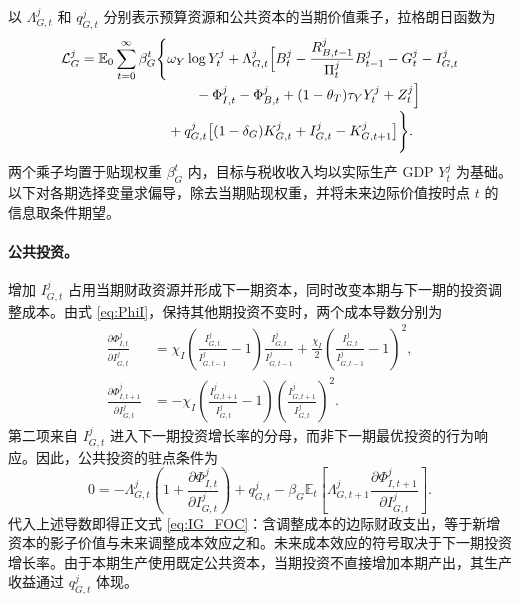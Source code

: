 \documentclass[12pt,UTF8]{ctexart}
\newcommand{\E}{\mathbb{E}}
\begin{document}
	以 $\Lambda_{G,t}^j$ 和 $q_{G,t}^j$ 分别表示预算资源和公共资本的当期价值乘子，拉格朗日函数为
	\begin{align}
		\mathcal L_G^j=\E_0\sum_{t=0}^{\infty}\beta_G^t\Bigg\{&\omega_Y\log Y_t^j
		+\Lambda_{G,t}^j\Big[B_t^j-\frac{R_{B,t-1}^j}{\Pi_t^j}B_{t-1}^j-G_t^j-I_{G,t}^j \notag\\[-0.2em]
		&\qquad-\Phi_{I,t}^j-\Phi_{B,t}^j
		+(1-\theta_T)\tau_Y Y_t^j+Z_t^j\Big] \notag\\[-0.2em]
		&+q_{G,t}^j\big[(1-\delta_G)K_{G,t}^j+I_{G,t}^j-K_{G,t+1}^j\big]\Bigg\}.
		\label{eq:gov_lagrangian}
	\end{align}
	两个乘子均置于贴现权重 $\beta_G^t$ 内，目标与税收收入均以实际生产 GDP $Y_t^j$ 为基础。以下对各期选择变量求偏导，除去当期贴现权重，并将未来边际价值按时点 $t$ 的信息取条件期望。
	
	\paragraph{公共投资。}
	增加 $I_{G,t}^j$ 占用当期财政资源并形成下一期资本，同时改变本期与下一期的投资调整成本。由式 \eqref{eq:PhiI}，保持其他期投资不变时，两个成本导数分别为
	\begin{align*}
		\frac{\partial\Phi_{I,t}^j}{\partial I_{G,t}^j}
		&=\chi_I\left(\frac{I_{G,t}^j}{I_{G,t-1}^j}-1\right)
		\frac{I_{G,t}^j}{I_{G,t-1}^j}
		+\frac{\chi_I}{2}\left(\frac{I_{G,t}^j}{I_{G,t-1}^j}-1\right)^2,\\
		\frac{\partial\Phi_{I,t+1}^j}{\partial I_{G,t}^j}
		&=-\chi_I\left(\frac{I_{G,t+1}^j}{I_{G,t}^j}-1\right)
		\left(\frac{I_{G,t+1}^j}{I_{G,t}^j}\right)^2.
	\end{align*}
	第二项来自 $I_{G,t}^j$ 进入下一期投资增长率的分母，而非下一期最优投资的行为响应。因此，公共投资的驻点条件为
	\begin{equation*}
		0=-\Lambda_{G,t}^j\left(1+\frac{\partial\Phi_{I,t}^j}{\partial I_{G,t}^j}\right)
		+q_{G,t}^j
		-\beta_G \E_t\left[\Lambda_{G,t+1}^j
		\frac{\partial\Phi_{I,t+1}^j}{\partial I_{G,t}^j}\right].
	\end{equation*}
	代入上述导数即得正文式 \eqref{eq:IG_FOC}：含调整成本的边际财政支出，等于新增资本的影子价值与未来调整成本效应之和。未来成本效应的符号取决于下一期投资增长率。由于本期生产使用既定公共资本，当期投资不直接增加本期产出，其生产收益通过 $q_{G,t}^j$ 体现。
	
\end{document}
